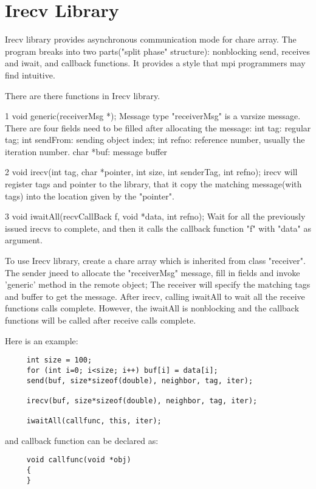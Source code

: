 \section{Irecv Library}

{\sc Irecv} library provides asynchronous communication mode for chare array. The program breaks into two parts("split phase" structure): nonblocking send, receives and iwait, and callback functions. It provides a style that mpi programmers may find intuitive. 

There are there functions in Irecv library.

1 void generic(receiverMsg *);
Message type "receiverMsg" is a varsize message. There are four fields need to be filled after allocating the message:
int tag: regular tag;
int sendFrom: sending object index;
int refno: reference number, usually the iteration number.
char *buf:   message buffer
  

2 void irecv(int tag, char *pointer, int size, int senderTag, int refno);
irecv will register tags and pointer to the library, that it copy the matching message(with tags) into the location given by the "pointer".

3 void iwaitAll(recvCallBack f, void *data, int refno);
Wait for all the previously issued irecvs to complete, and then it calls the callback function "f" with "data" as argument.

To use Irecv library, create a chare array which is inherited from class "receiver". The sender jneed to allocate the "receiverMsg" message, fill in fields and invoke 'generic' method in the remote object; The receiver will specify the matching tags and buffer to get the message. After irecv, calling iwaitAll to wait all the receive functions calls complete. However, the iwaitAll is nonblocking and the callback functions will be called after receive calls complete.

Here is an example:

\begin{verbatim}
     int size = 100;
     for (int i=0; i<size; i++) buf[i] = data[i];
     send(buf, size*sizeof(double), neighbor, tag, iter);

     irecv(buf, size*sizeof(double), neighbor, tag, iter);

     iwaitAll(callfunc, this, iter);
\end{verbatim}

and callback function can be declared as:

\begin{verbatim}
     void callfunc(void *obj)
     {
     }
\end{verbatim}
